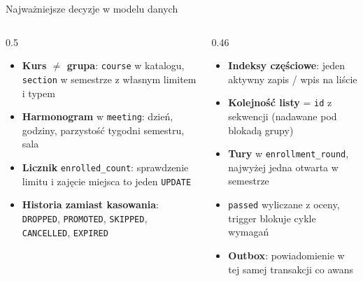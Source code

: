 \documentclass[aspectratio=169,11pt]{beamer}
\begin{document}
\begin{frame}{Najważniejsze decyzje w modelu danych}
  \begin{columns}[T]
    \begin{column}{0.5\textwidth}
      \small
      \begin{itemize}
        \item \textbf{Kurs $\neq$ grupa}: \texttt{course} w katalogu, \texttt{section} w semestrze z własnym limitem i typem
        \item \textbf{Harmonogram} w \texttt{meeting}: dzień, godziny, parzystość tygodni semestru, sala
        \item \textbf{Licznik} \texttt{enrolled\_count}: sprawdzenie limitu i zajęcie miejsca to jeden \texttt{UPDATE}
        \item \textbf{Historia zamiast kasowania}: \texttt{DROPPED}, \texttt{PROMOTED}, \texttt{SKIPPED}, \texttt{CANCELLED}, \texttt{EXPIRED}
      \end{itemize}
    \end{column}
    \begin{column}{0.46\textwidth}
      \small
      \begin{itemize}
        \item \textbf{Indeksy częściowe}: jeden aktywny zapis / wpis na liście
        \item \textbf{Kolejność listy} = \texttt{id} z sekwencji (nadawane pod blokadą grupy)
        \item \textbf{Tury} w \texttt{enrollment\_round}, najwyżej jedna otwarta w semestrze
        \item \texttt{passed} wyliczane z oceny, trigger blokuje cykle wymagań
        \item \textbf{Outbox}: powiadomienie w tej samej transakcji co awans
      \end{itemize}
    \end{column}
  \end{columns}
\end{frame}
\end{document}

